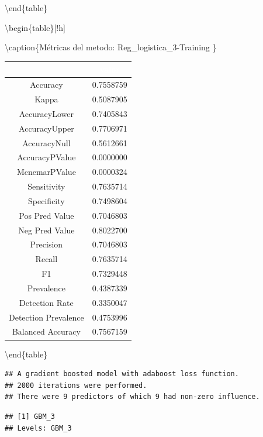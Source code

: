 \documentclass[]{article}
\begin{document}
\textbackslash{}end\{table\}

\textbackslash{}begin\{table\}{[}!h{]}

\textbackslash{}caption\{\label{tab:metricas_Reg_logistica_3-Training}Métricas
del metodo: Reg\_logistica\_3-Training \} \centering

\begin{tabular}[t]{cc}
\toprule
\rowcolor{black}  \multicolumn{1}{c}{\textcolor{white}{\textbf{metricas}}} & \multicolumn{1}{c}{\textcolor{white}{\textbf{valor}}}\\
\midrule
\rowcolor{gray!6}  Accuracy & 0.7558759\\
Kappa & 0.5087905\\
\rowcolor{gray!6}  AccuracyLower & 0.7405843\\
AccuracyUpper & 0.7706971\\
\rowcolor{gray!6}  AccuracyNull & 0.5612661\\
\addlinespace
AccuracyPValue & 0.0000000\\
\rowcolor{gray!6}  McnemarPValue & 0.0000324\\
Sensitivity & 0.7635714\\
\rowcolor{gray!6}  Specificity & 0.7498604\\
Pos Pred Value & 0.7046803\\
\addlinespace
\rowcolor{gray!6}  Neg Pred Value & 0.8022700\\
Precision & 0.7046803\\
\rowcolor{gray!6}  Recall & 0.7635714\\
F1 & 0.7329448\\
\rowcolor{gray!6}  Prevalence & 0.4387339\\
\addlinespace
Detection Rate & 0.3350047\\
\rowcolor{gray!6}  Detection Prevalence & 0.4753996\\
Balanced Accuracy & 0.7567159\\
\bottomrule
\end{tabular}

\textbackslash{}end\{table\}

\begin{lstlisting}
## A gradient boosted model with adaboost loss function.
## 2000 iterations were performed.
## There were 9 predictors of which 9 had non-zero influence.
\end{lstlisting}

\begin{lstlisting}
## [1] GBM_3
## Levels: GBM_3
\end{lstlisting}
\end{document}

